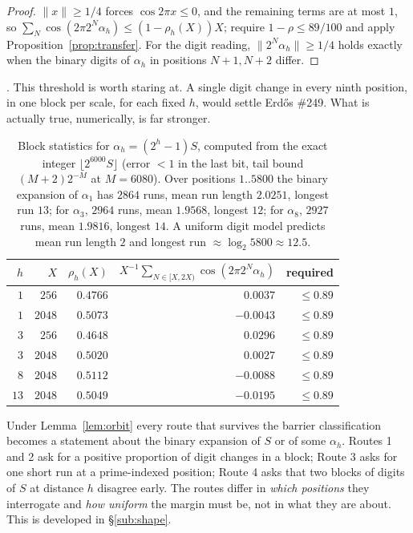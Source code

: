\begin{proof}
$\|x\|\ge 1/4$ forces $\cos 2\pi x\le 0$, and the remaining terms are at most
$1$, so $\sum_{N}\cos(2\pi 2^N\alpha_h)\le (1-\rho_h(X))X$; require
$1-\rho\le 89/100$ and apply Proposition~\ref{prop:transfer}. For the digit
reading, $\|2^N\alpha_h\|\ge 1/4$ holds exactly when the binary digits of
$\alpha_h$ in positions $N+1,N+2$ differ.
\end{proof}

\noindent
{}. This threshold is worth staring at. A single digit change in
every ninth position, in one block per scale, for each fixed $h$, would
settle Erd\H{o}s \#249. What is actually true, numerically, is far stronger.

\begin{table}[h]\centering
\begin{tabular}{r r r r r}
\hline
$h$ & $X$ & $\rho_h(X)$ & $X^{-1}\sum_{N\in[X,2X)}\cos(2\pi 2^N\alpha_h)$ & required \\
\hline
$1$ & $256$  & $0.4766$ & $\phantom{-}0.0037$ & $\le 0.89$ \\
$1$ & $2048$ & $0.5073$ & $-0.0043$ & $\le 0.89$ \\
$3$ & $256$  & $0.4648$ & $\phantom{-}0.0296$ & $\le 0.89$ \\
$3$ & $2048$ & $0.5020$ & $\phantom{-}0.0027$ & $\le 0.89$ \\
$8$ & $2048$ & $0.5112$ & $-0.0088$ & $\le 0.89$ \\
$13$& $2048$ & $0.5049$ & $-0.0195$ & $\le 0.89$ \\
\hline
\end{tabular}
\caption{Block statistics for $\alpha_h=(2^h-1)S$, computed from the exact
integer $\lfloor 2^{6000}S\rfloor$ (error $<1$ in the last bit, tail bound
$(M+2)2^{-M}$ at $M=6080$). Over positions $1..5800$ the binary expansion of
$\alpha_1$ has $2864$ runs, mean run length $2.0251$, longest run $13$; for
$\alpha_3$, $2964$ runs, mean $1.9568$, longest $12$; for $\alpha_8$, $2927$
runs, mean $1.9816$, longest $14$. A uniform digit model predicts mean run
length $2$ and longest run $\approx\log_2 5800\approx 12.5$. }
\label{tab:blocks}
\end{table}

\begin{obs}\label{obs:allroutes}
Under Lemma~\ref{lem:orbit} every route that survives the barrier
classification becomes a statement about the binary expansion of $S$ or of
some $\alpha_h$. Routes 1 and 2 ask for a positive proportion of digit
changes in a block; Route 3 asks for one short run at a prime-indexed
position; Route 4 asks that two blocks of digits of $S$ at distance $h$
disagree early. The routes differ in \emph{which positions} they interrogate
and \emph{how uniform} the margin must be, not in what they are about. This
is developed in \S\ref{sub:shape}.
\end{obs}

